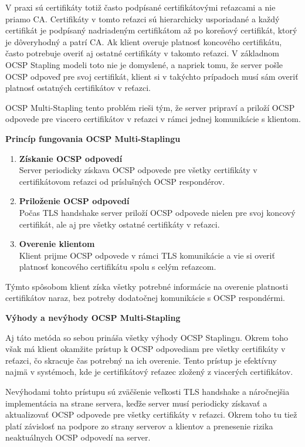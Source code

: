 \documentclass[12pt, twoside]{book}
\newcommand{\subsubsubsection}[1]{%
  \vspace{0.2em}  
  \textbf{#1} \\[0.2em]
  \hspace*{\parindent}
}
\begin{document}
V praxi sú certifikáty totiž často podpísané certifikátovými reťazcami a nie priamo CA. Certifikáty v tomto reťazci sú hierarchicky usporiadané a každý certifikát je podpísaný nadriadeným certifikátom až po koreňový certifikát, ktorý je dôveryhodný a patrí CA. Ak klient overuje platnosť koncového certifikátu, často potrebuje overiť aj ostatné certifikáty v takomto reťazci. V základnom OCSP Stapling modeli toto nie je domyslené, a napriek tomu, že server pošle OCSP odpoveď pre svoj certifikát, klient si v takýchto prípadoch musí sám overiť platnosť ostatných certifikátov v reťazci.

OCSP Multi-Stapling tento problém rieši tým, že server pripraví a priloží OCSP odpovede pre viacero certifikátov v reťazci v rámci jednej komunikácie s klientom.


\subsubsubsection{Princíp fungovania OCSP Multi-Staplingu}
\begin{enumerate}
\item \textbf{Získanie OCSP odpovedí} \\
Server periodicky získava OCSP odpovede pre všetky certifikáty v certifikátovom reťazci od príslušných OCSP respondérov.

\item\textbf{ Priloženie OCSP odpovedí}\\
Počas TLS handshake server priloží OCSP odpovede nielen pre svoj koncový certifikát, ale aj pre všetky ostatné certifikáty v reťazci.

\item \textbf{Overenie klientom}\\
Klient prijme OCSP odpovede v rámci TLS komunikácie a vie si overiť platnosť koncového certifikátu spolu s celým reťazcom.
\end{enumerate}

Týmto spôsobom klient získa všetky potrebné informácie na overenie platnosti certifikátov naraz, bez potreby dodatočnej komunikácie s OCSP respondérmi.

\subsubsubsection{Výhody a nevýhody OCSP Multi-Stapling}
Aj táto metóda so sebou prináša všetky výhody OCSP Staplingu. Okrem toho však má klient okamžite prístup k OCSP odpovediam pre všetky certifikáty v reťazci, čo skracuje čas potrebný na ich overenie. Tento prístup je efektívny najmä v systémoch, kde je certifikátový reťazec zložený z viacerých  certifikátov.

Nevýhodami tohto prístupu sú zväčšenie veľkosti TLS handshake a náročnejšia implementácia na strane servera, keďže server musí periodicky získavať a aktualizovať OCSP odpovede pre všetky certifikáty v reťazci. Okrem toho tu tiež platí závislosť na podpore zo strany serverov a klientov a prenesenie rizika neaktuálnych OCSP odpovedí na server.
\end{document}
